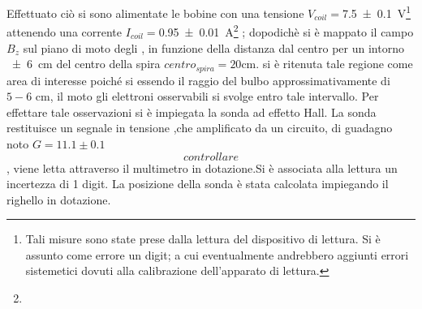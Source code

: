 		Effettuato ciò si sono alimentate le bobine con una tensione $V_{coil}=$\SI{7.5 \pm 0.1}{\volt}\footnote{Tali misure sono state prese dalla lettura del dispositivo di lettura.
		Si è assunto come errore un digit; a cui eventualmente andrebbero
		aggiunti errori sistemetici dovuti alla calibrazione dell'apparato
		di lettura.}
		attenendo una corrente $I_{coil}=$\SI{0.95 \pm 0.01}{\ampere}\footnote[1]{}
		;
		dopodichè si è mappato il campo $B_z$ sul
		piano di moto degli \e, in funzione della distanza dal centro per un intorno \SI{\pm 6}{cm} del centro della spira $centro_{spira}=20$cm. si è ritenuta tale regione come area di interesse poiché si essendo il raggio del bulbo approssimativamente di $5-6$ cm, il moto gli elettroni osservabili si svolge entro tale intervallo.
		Per effettare tale osservazioni si è impiegata la sonda ad effetto Hall.	
		La sonda restituisce un segnale in tensione ,che amplificato da un circuito,
		di guadagno noto $G=11.1 \pm 0.1$ $$controllare$$, viene letta attraverso il multimetro 
		in dotazione.Si è associata alla lettura un incertezza di 1 digit.
		La posizione della sonda è stata calcolata impiegando il righello in dotazione.
		
